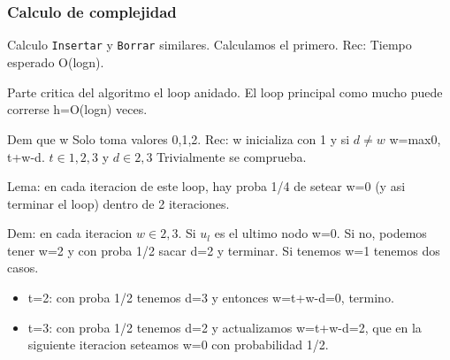 \documentclass[10pt,handout]{beamer}
\begin{document}
\section{}
\begin{frame}
\frametitle{Calculo de complejidad}

Calculo \texttt{Insertar} y \texttt{Borrar} similares.
Calculamos el primero.
Rec: Tiempo esperado O(logn).
\vspace{-0.2cm}

Parte critica del algoritmo el loop anidado. El loop principal como mucho puede
correrse h=O(logn) veces.
\vspace{-0.2cm}

Dem que w Solo toma valores {0,1,2}. Rec: w inicializa con 1 y si $d\neq w$ w=max{0, t+w-d}. $t\in{1,2,3}$ y $d\in{2,3}$
Trivialmente se comprueba.
\vspace{-0.2cm}

Lema: en cada iteracion de este loop, hay proba 1/4 de setear w=0 (y asi terminar el loop) dentro de 2 iteraciones.
\vspace{-0.2cm}

Dem: en cada iteracion $w\in{2,3}$. Si $u_l$ es el ultimo nodo w=0.
Si no, podemos tener w=2 y con proba 1/2 sacar d=2 y terminar.
Si tenemos w=1 tenemos dos casos.
\vspace{-0.3cm}
\begin{itemize}\itemsep-1em
  \item t=2: con proba 1/2 tenemos d=3 y entonces w=t+w-d=0, termino.
  \item t=3: con proba 1/2 tenemos d=2 y actualizamos  w=t+w-d=2, que en la siguiente
    iteracion seteamos w=0 con probabilidad 1/2.
\end{itemize}
\end{frame}

\end{document}
